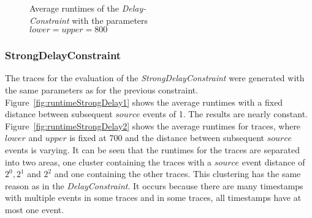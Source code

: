\begin{figure}
\begin{minipage}{0.45\textwidth}
			\centering
			\caption{Average runtimes of the \textit{Delay-\\Constraint} with the parameters\\ $lower = upper = 800$}
			\label{fig:runtimeDelay2}
		\end{minipage}
		\centering
	\end{figure}


\subsubsection{StrongDelayConstraint}
	The traces for the evaluation of the \textit{StrongDelayConstraint} were generated with the same parameters as for the previous constraint. Figure~\ref{fig:runtimeStrongDelay1} shows the average runtimes with a fixed distance between subsequent $source$ events of 1. The results are nearly constant. Figure~\ref{fig:runtimeStrongDelay2} shows the average runtimes for traces, where $lower$ and $upper$ is fixed at 700 and the distance between subsequent $source$ events is varying. It can be seen that the runtimes for the traces are separated into two areas, one cluster containing the traces with a $source$ event distance of $2^0, 2^1$ and $2^2$ and one containing the other traces. This clustering has the same reason as in the \textit{DelayConstraint}. It occurs because there are many timestamps with multiple events in some traces and in some traces, all timestamps have at most one event.
	
